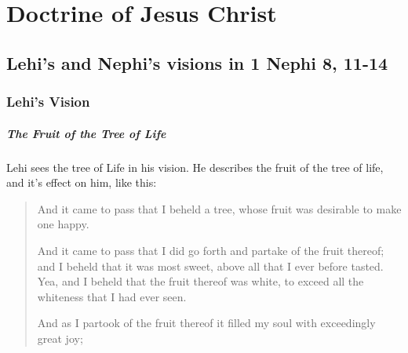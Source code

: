\chapter{Doctrine of Jesus Christ}

\section{Lehi's and Nephi's visions in 1 Nephi 8, 11-14}

\subsection{Lehi's Vision}

\paragraph{The Fruit of the Tree of Life}
Lehi sees the tree of Life in his vision. He describes the fruit of the tree of life, and it's effect on him, like this:

\begin{quotation}
And it came to pass that I beheld a tree, whose fruit was desirable to make one happy.

And it came to pass that I did go forth and partake of the fruit thereof; and I beheld that it was most sweet, above all that I ever before tasted. Yea, and I beheld that the fruit thereof was white, to exceed all the whiteness that I had ever seen.

And as I partook of the fruit thereof it filled my soul with exceedingly great joy;
\end{quotation}


